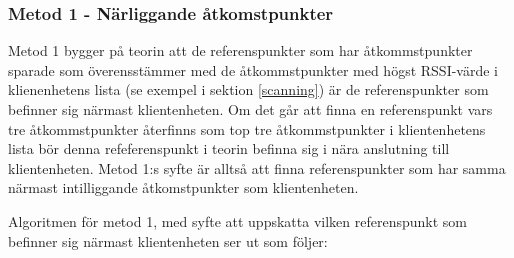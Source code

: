 \documentclass[swedish, a4paper,12pt]{article}
\begin{document}
\subsubsection{Metod 1 - Närliggande åtkomstpunkter}

Metod 1 bygger på teorin att de referenspunkter som har åtkommstpunkter sparade som överensstämmer med de åtkommstpunkter med högst RSSI-värde i klienenhetens lista (se exempel i sektion \ref{scanning}) är de referenspunkter som befinner sig närmast klientenheten. Om det går att finna en referenspunkt vars tre åtkommstpunkter återfinns som top tre åtkommstpunkter i klientenhetens lista bör denna refeferenspunkt i teorin befinna sig i nära anslutning till klientenheten.
Metod 1:s syfte är alltså att finna referenspunkter som har samma närmast intilliggande åtkomstpunkter som klientenheten.

Algoritmen för metod 1, med syfte att uppskatta vilken referenspunkt som befinner sig närmast klientenheten ser ut som följer:
\end{document}
